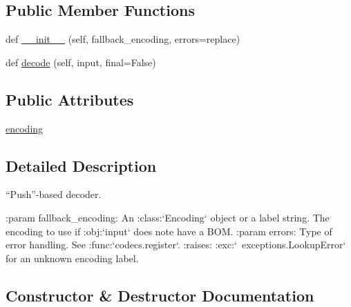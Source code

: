 \subsection*{Public Member Functions}
\begin{DoxyCompactItemize}
\item 
def \hyperlink{classpip_1_1__vendor_1_1webencodings_1_1IncrementalDecoder_aef7dedd595b534dd2ed1d77c1df01d23}{\+\_\+\+\_\+init\+\_\+\+\_\+} (self, fallback\+\_\+encoding, errors=\textquotesingle{}replace\textquotesingle{})
\item 
def \hyperlink{classpip_1_1__vendor_1_1webencodings_1_1IncrementalDecoder_a289670326c90e6a11d420fb6ad9dcb62}{decode} (self, input, final=False)
\end{DoxyCompactItemize}
\subsection*{Public Attributes}
\begin{DoxyCompactItemize}
\item 
\hyperlink{classpip_1_1__vendor_1_1webencodings_1_1IncrementalDecoder_a7251fe0361b0320f6579f7b8635609ee}{encoding}
\end{DoxyCompactItemize}


\subsection{Detailed Description}
\begin{DoxyVerb}“Push”-based decoder.

:param fallback_encoding:
    An :class:`Encoding` object or a label string.
    The encoding to use if :obj:`input` does note have a BOM.
:param errors: Type of error handling. See :func:`codecs.register`.
:raises: :exc:`~exceptions.LookupError` for an unknown encoding label.\end{DoxyVerb}
 

\subsection{Constructor \& Destructor Documentation}
\mbox{\label{classpip_1_1__vendor_1_1webencodings_1_1IncrementalDecoder_aef7dedd595b534dd2ed1d77c1df01d23}} 
